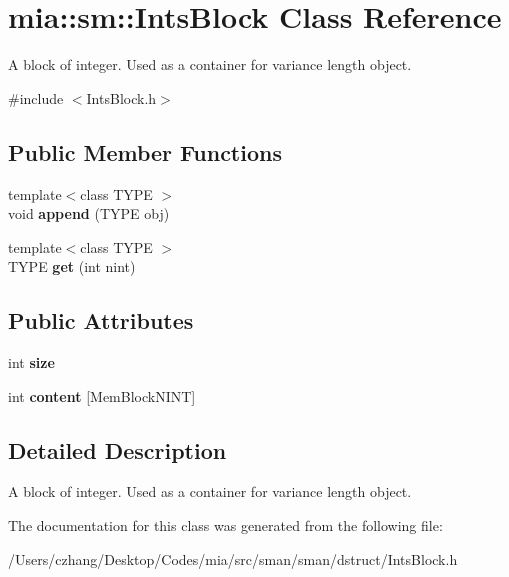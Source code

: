 \hypertarget{classmia_1_1sm_1_1_ints_block}{\section{mia\-:\-:sm\-:\-:Ints\-Block Class Reference}
\label{classmia_1_1sm_1_1_ints_block}
}


A block of integer. Used as a container for variance length object.  




{\ttfamily \#include $<$Ints\-Block.\-h$>$}

\subsection*{Public Member Functions}
\begin{DoxyCompactItemize}
\item 
\hypertarget{classmia_1_1sm_1_1_ints_block_a5d9e15e2d7196a84746cbbb2db2b90aa}{{\footnotesize template$<$class T\-Y\-P\-E $>$ }\\void {\bfseries append} (T\-Y\-P\-E obj)}\label{classmia_1_1sm_1_1_ints_block_a5d9e15e2d7196a84746cbbb2db2b90aa}

\item 
\hypertarget{classmia_1_1sm_1_1_ints_block_a2f8109be82fff2222b1163e4ea82e223}{{\footnotesize template$<$class T\-Y\-P\-E $>$ }\\T\-Y\-P\-E {\bfseries get} (int nint)}\label{classmia_1_1sm_1_1_ints_block_a2f8109be82fff2222b1163e4ea82e223}

\end{DoxyCompactItemize}
\subsection*{Public Attributes}
\begin{DoxyCompactItemize}
\item 
\hypertarget{classmia_1_1sm_1_1_ints_block_a0081a01b017e835aaa428875a6428409}{int {\bfseries size}}\label{classmia_1_1sm_1_1_ints_block_a0081a01b017e835aaa428875a6428409}

\item 
\hypertarget{classmia_1_1sm_1_1_ints_block_a5bca4c9ccc401e60a045233adaef3d8f}{int {\bfseries content} \mbox{[}Mem\-Block\-N\-I\-N\-T\mbox{]}}\label{classmia_1_1sm_1_1_ints_block_a5bca4c9ccc401e60a045233adaef3d8f}

\end{DoxyCompactItemize}


\subsection{Detailed Description}
A block of integer. Used as a container for variance length object. 

The documentation for this class was generated from the following file\-:\begin{DoxyCompactItemize}
\item 
/\-Users/czhang/\-Desktop/\-Codes/mia/src/sman/sman/dstruct/Ints\-Block.\-h\end{DoxyCompactItemize}
